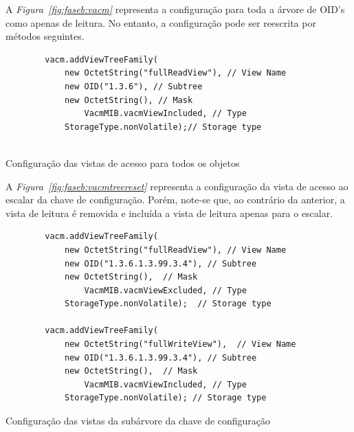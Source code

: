  A  \emph{Figura~\ref{fig:faseb:vacm}} representa a configuração para toda
 a árvore de OID's como apenas de leitura. No entanto, a configuração pode ser
 reescrita por métodos seguintes.

\begin{center}
 	 	\begin{verbatim}
		vacm.addViewTreeFamily(
			new OctetString("fullReadView"), // View Name 
			new OID("1.3.6"), // Subtree
			new OctetString(), // Mask
				VacmMIB.vacmViewIncluded, // Type 
			StorageType.nonVolatile);// Storage type


\end{verbatim}
 	\captionsetup{type=figure, width=0.8\linewidth}
	\caption{Configuração das vistas de acesso para todos os objetos}
\label{fig:faseb:vacm} 
\end{center}

 A  \emph{Figura~\ref{fig:faseb:vacmtreereset}} representa a configuração da
 vista de acesso ao escalar da chave de configuração. Porém, note-se que, ao
 contrário da anterior, a vista de leitura é removida e incluída a vista de
 leitura apenas para o escalar.

\begin{center}
\begin{verbatim}
		vacm.addViewTreeFamily(
			new OctetString("fullReadView"), // View Name 
			new OID("1.3.6.1.3.99.3.4"), // Subtree
			new OctetString(),  // Mask
				VacmMIB.vacmViewExcluded, // Type 
			StorageType.nonVolatile);  // Storage type

		vacm.addViewTreeFamily(
			new OctetString("fullWriteView"),  // View Name 
			new OID("1.3.6.1.3.99.3.4"), // Subtree
			new OctetString(),  // Mask
				VacmMIB.vacmViewIncluded, // Type 
			StorageType.nonVolatile); // Storage type

\end{verbatim}
 	\captionsetup{type=figure, width=0.8\linewidth}
	\caption{Configuração das vistas da subárvore da chave de configuração}
\label{fig:faseb:vacmtreereset} 
\end{center}

\newpage

